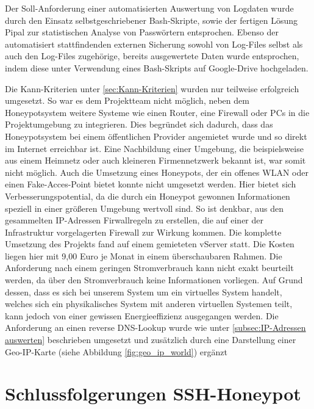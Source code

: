 Der Soll-Anforderung einer automatisierten Auswertung von Logdaten wurde durch den Einsatz selbstgeschriebener Bash-Skripte, sowie der fertigen Lösung Pipal zur statistischen Analyse von Passwörtern entsprochen. Ebenso der automatisiert stattfindenden externen Sicherung sowohl von Log-Files selbst als auch den Log-Files zugehörige, bereits ausgewertete Daten wurde entsprochen, indem diese unter Verwendung eines Bash-Skripts auf Google-Drive hochgeladen. 

Die Kann-Kriterien unter \ref{sec:Kann-Kriterien} wurden nur teilweise erfolgreich umgesetzt. So war es dem Projektteam nicht möglich, neben dem Honeypotsystem weitere Systeme wie einen Router, eine Firewall oder PCs in die Projektumgebung zu integrieren. Dies begründet sich dadurch, dass das Honeypotsystem bei einem öffentlichen Provider angemietet wurde und so direkt im Internet erreichbar ist. Eine Nachbildung einer Umgebung, die beispielsweise aus einem Heimnetz oder auch kleineren Firmennetzwerk bekannt ist, war somit nicht möglich. Auch die Umsetzung eines Honeypots, der ein offenes WLAN oder einen Fake-Acces-Point bietet konnte nicht umgesetzt werden. Hier bietet sich Verbesserungspotential, da die durch ein Honeypot gewonnen Informationen speziell in einer größeren Umgebung wertvoll sind. So ist denkbar, aus den gesammelten IP-Adressen Firwallregeln zu erstellen, die auf einer der Infrastruktur vorgelagerten Firewall zur Wirkung kommen.
Die komplette Umsetzung des Projekts fand auf einem gemieteten vServer statt. Die Kosten liegen hier mit 9,00 Euro je Monat in einem überschaubaren Rahmen. Die Anforderung nach einem geringen Stromverbrauch kann nicht exakt beurteilt werden, da über den Stromverbrauch keine Informationen vorliegen. Auf Grund dessen, dass es sich bei unserem System um ein virtuelles System handelt, welches sich ein physikalisches System mit anderen virtuellen Systemen teilt, kann jedoch von einer gewissen Energieeffizienz ausgegangen werden. Die Anforderung an einen reverse DNS-Lookup wurde wie unter \ref{subsec:IP-Adressen auswerten} beschrieben umgesetzt und zusätzlich durch eine Darstellung einer Geo-IP-Karte (siehe Abbildung \ref{fig:geo_ip_world}) ergänzt

\section{Schlussfolgerungen SSH-Honeypot}
\label{sec:Schlussfolgerungen SSH-Honeypot}


